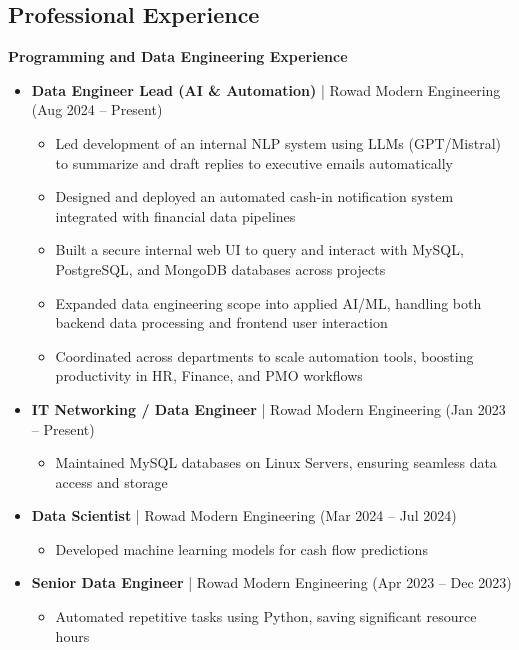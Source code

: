 \documentclass[10pt, letterpaper]{article}
\begin{document}
\begin{mdframed}[style=cvframe]
\begin{multicols}{2}
\section{Professional Experience}
\textbf{\textcolor{primaryColor}{Programming and Data Engineering Experience}}
\begin{itemize}[leftmargin=*]
    \item \textbf{Data Engineer Lead (AI \& Automation)} | Rowad Modern Engineering (Aug 2024 -- Present)
    \begin{itemize}[leftmargin=1cm]
        \item Led development of an internal NLP system using LLMs (GPT/Mistral) to summarize and draft replies to executive emails automatically
        \item Designed and deployed an automated cash-in notification system integrated with financial data pipelines
        \item Built a secure internal web UI to query and interact with MySQL, PostgreSQL, and MongoDB databases across projects
        \item Expanded data engineering scope into applied AI/ML, handling both backend data processing and frontend user interaction
        \item Coordinated across departments to scale automation tools, boosting productivity in HR, Finance, and PMO workflows
    \end{itemize}

\columnbreak

    \item \textbf{IT Networking / Data Engineer} | Rowad Modern Engineering (Jan 2023 -- Present)
    \begin{itemize}[leftmargin=1cm]
        \item Maintained MySQL databases on Linux Servers, ensuring seamless data access and storage
    \end{itemize}

    \item \textbf{Data Scientist} | Rowad Modern Engineering (Mar 2024 -- Jul 2024)
    \begin{itemize}[leftmargin=1cm]
        \item Developed machine learning models for cash flow predictions
    \end{itemize}
    
    \item \textbf{Senior Data Engineer} | Rowad Modern Engineering (Apr 2023 -- Dec 2023)
    \begin{itemize}[leftmargin=1cm]
        \item Automated repetitive tasks using Python, saving significant resource hours
    \end{itemize}
\end{itemize}


\end{multicols}
\end{mdframed}
\end{document}
